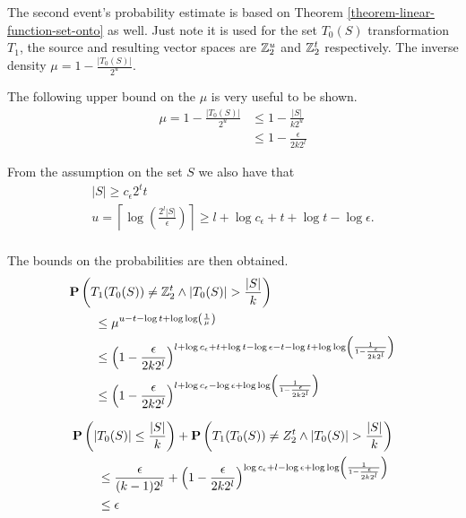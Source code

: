 The second event's probability estimate is based on Theorem \ref{theorem-linear-function-set-onto} as well. Just note it is used for the set $T_0(S)$ transformation $T_1$, the source and resulting vector spaces are $\mathbb{Z}_{2}^{u}$ and $\mathbb{Z}_{2}^{t}$ respectively. The inverse density $\mu = 1 - \frac{|T_0(S)|}{2^u}$.

The following upper bound on the $\mu$ is very useful to be shown.
\[
\begin{split}
\mu = 1 - \frac{|T_0(S)|}{2^u} 
	& \leq 1 - \frac{|S|}{k 2 ^ u} \\
	& \leq 1 - \frac{\epsilon}{2 k 2 ^ l}
\end{split}
\]

From the assumption on the set $S$ we also have that
\begin{gather*}
	|S| \geq c_\epsilon 2^t t \\
	u = \left\lceil \log \left(\frac{2^l |S|}{\epsilon}\right) \right\rceil \geq l + \log c_\epsilon + t + \log t - \log \epsilon \text{.} \\
\end{gather*}

The bounds on the probabilities are then obtained.
\[
\begin{split}
& \mathbf{P}\left(T_1(T_0(S)) \neq \mathbb{Z}_{2}^{t} \wedge |T_0(S)| > \frac{|S|}{k}\right) \\
	& \qquad \leq \mu ^ {u - t - \log t + \log \log \left(\frac{1}{\mu}\right)} \\
	& \qquad \leq \left(1 - \frac{\epsilon}{2 k 2 ^ l}\right)^{l + \log c_\epsilon + t + \log t - \log \epsilon - t - \log t + \log \log \left(\frac{1}{1 - \frac{\epsilon}{2 k 2 ^ l}}\right)} \\
	& \qquad \leq \left(1 - \frac{\epsilon}{2 k 2 ^ l}\right)^{l + \log c_\epsilon - \log \epsilon + \log \log \left(\frac{1}{1 - \frac{\epsilon}{2 k 2 ^ l}}\right)} \\
\end{split}
\]

\[
\begin{split}
& \mathbf{P}\left(|T_0(S)| \leq \frac{|S|}{k}\right) + \mathbf{P}\left(T_1(T_0(S)) \neq Z_2^t \wedge |T_0(S)| > \frac{|S|}{k}\right) \\ 
	& \qquad \leq \frac{\epsilon}{(k - 1) 2 ^ l} + \left(1 - \frac{\epsilon}{2 k 2^l}\right)^{\log c_\epsilon + l - \log \epsilon + \log \log \left(\frac{1}{1 - \frac{\epsilon}{2 k 2^l}}\right)} \\
	& \qquad \leq \epsilon \\
\end{split}
\]

